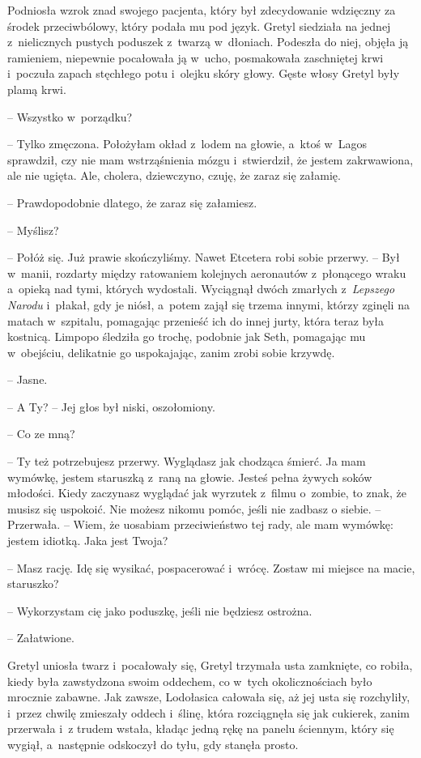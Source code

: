 \documentclass[oneside,polish,11pt,sfheadings]{mwbk}
\begin{document}
Podniosła wzrok znad swojego pacjenta, który był zdecydowanie wdzięczny za
środek przeciwbólowy, który podała mu pod język. Gretyl siedziała na
jednej z~nielicznych pustych poduszek z~twarzą w~dłoniach. Podeszła do
niej, objęła ją ramieniem, niepewnie pocałowała ją w~ucho, posmakowała
zaschniętej krwi i~poczuła zapach stęchłego potu i~olejku skóry głowy.
Gęste włosy Gretyl były plamą krwi.

-- Wszystko w~porządku?

-- Tylko zmęczona. Położyłam okład z~lodem na głowie, a~ktoś w~Lagos
sprawdził, czy nie mam wstrząśnienia mózgu i~stwierdził, że jestem
zakrwawiona, ale nie ugięta. Ale, cholera, dziewczyno, czuję, że zaraz
się załamię.

-- Prawdopodobnie dlatego, że zaraz się załamiesz.

-- Myślisz?

-- Połóż się. Już prawie skończyliśmy. Nawet Etcetera robi sobie przerwy.
-- Był w~manii, rozdarty między ratowaniem kolejnych aeronautów z~płonącego wraku a~opieką nad tymi, których wydostali. Wyciągnął dwóch
zmarłych z~\textit{Lepszego Narodu} i~płakał, gdy je niósł, a~potem zajął
się trzema innymi, którzy zginęli na matach w~szpitalu, pomagając
przenieść ich do innej jurty, która teraz była kostnicą. Limpopo
śledziła go trochę, podobnie jak Seth, pomagając mu w~obejściu,
delikatnie go uspokajając, zanim zrobi sobie krzywdę.

-- Jasne. 

-- A Ty? -- Jej głos był niski, oszołomiony.

-- Co ze mną?

-- Ty też potrzebujesz przerwy. Wyglądasz jak chodząca śmierć. Ja mam
wymówkę, jestem staruszką z~raną na głowie. Jesteś pełna żywych soków
młodości. Kiedy zaczynasz wyglądać jak wyrzutek z~filmu o~zombie, to
znak, że musisz się uspokoić. Nie możesz nikomu pomóc, jeśli nie zadbasz
o siebie. -- Przerwała. -- Wiem, że uosabiam przeciwieństwo tej rady, ale
mam wymówkę: jestem idiotką. Jaka jest Twoja?

-- Masz rację. Idę się wysikać, pospacerować i~wrócę. Zostaw mi miejsce
na macie, staruszko?

-- Wykorzystam cię jako poduszkę, jeśli nie będziesz ostrożna.

-- Załatwione.

Gretyl uniosła twarz i~pocałowały się, Gretyl trzymała usta zamknięte,
co robiła, kiedy była zawstydzona swoim oddechem, co w~tych
okolicznościach było mrocznie zabawne. Jak zawsze, Lodołasica całowała
się, aż jej usta się rozchyliły, i~przez chwilę zmieszały oddech i~ślinę, która rozciągnęła się jak cukierek, zanim przerwała i~z trudem
wstała, kładąc jedną rękę na panelu ściennym, który się wygiął, a~następnie odskoczył do tyłu, gdy stanęła prosto.
\end{document}
